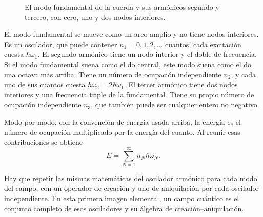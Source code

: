 \begin{figure}[t]
\centering
{}
\caption{El modo fundamental de la cuerda y sus armónicos segundo y tercero, con cero, uno y dos nodos interiores.}
\end{figure}

El modo fundamental se mueve como un arco amplio y no tiene nodos interiores. Es un oscilador, que puede contener \(n_1=0,1,2,\ldots\) cuantos; cada excitación cuesta \(\hbar\omega_1\). El segundo armónico tiene un nodo interior y el doble de frecuencia. Si el modo fundamental suena como el do central, este modo suena como el do una octava más arriba. Tiene un número de ocupación independiente \(n_2\), y cada uno de sus cuantos cuesta \(\hbar\omega_2=2\hbar\omega_1\). El tercer armónico tiene dos nodos interiores y una frecuencia triple de la fundamental. Tiene su propio número de ocupación independiente \(n_3\), que también puede ser cualquier entero no negativo.

Modo por modo, con la convención de energía usada arriba, la energía es el número de ocupación multiplicado por la energía del cuanto. Al reunir esas contribuciones se obtiene
\begin{equation}
E=\sum_{N=1}^{\infty} n_N\hbar\omega_N.
\end{equation}

Hay que repetir las mismas matemáticas del oscilador armónico para cada modo del campo, con un operador de creación y uno de aniquilación por cada oscilador independiente. En esta primera imagen elemental, un campo cuántico es el conjunto completo de esos osciladores y su álgebra de creación--aniquilación.


